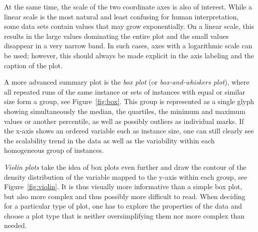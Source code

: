 \documentclass[algorithms,article,submit,moreauthors,pdftex]{Definitions/mdpi}
\begin{document}
At the same time, the scale of the two coordinate axes is also of interest.
While a linear scale is the most natural and least confusing for human interpretation, some data sets contain values that may grow exponentially.
On a linear scale, this results in the large values dominating the entire plot and the small values disappear in a very narrow band.
In such cases, axes with a logarithmic scale can be used; however, this should always be made explicit in the axis labeling and the caption of the plot.

A more advanced summary plot is the \emph{box plot} (or \emph{box-and-whiskers plot}), where all repeated runs of the same instance or sets of instances with equal or  similar size form a group, see Figure~\ref{fig:box}.
This group is represented as a single glyph showing simultaneously the median, the quartiles, the minimum and maximum values or another percentile, as well as possibly outliers as individual marks.
If the x-axis shows an ordered variable such as instance size, one can still clearly see the scalability trend in the data as well as the variability within each homogeneous group of instances.

\emph{Violin plots} take the idea of box plots even further and draw the contour of the density distribution of the variable mapped to the y-axis within each group, see Figure~\ref{fig:violin}.
It is thus visually more informative than a simple box plot, but also more complex and thus possibly more difficult to read.
When deciding for a particular type of plot, one has to explore the properties of the data and choose a plot type that is neither oversimplifying them nor more complex than needed.
\end{document}
